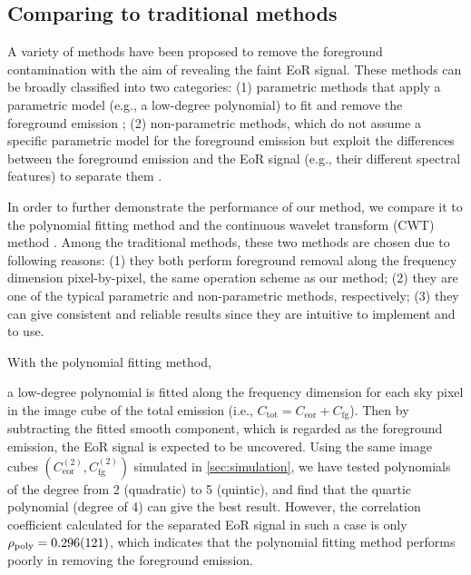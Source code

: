 \documentclass[fleqn,usenatbib]{mnras}
\newcommand{\R}[1]{\mathrm{#1}}
\newcommand{\editwip}[1]{{\leavevmode\color{magenta}#1}}
\begin{document}
\editwip{%
\subsection{Comparing to traditional methods}
\label{sec:comparisons}

A variety of methods have been proposed to remove the foreground
contamination with the aim of revealing the faint EoR signal.
These methods can be broadly classified into two categories:
(1) parametric methods that apply a parametric model (e.g., a low-degree
polynomial) to fit and remove the foreground emission
\citep[e.g.,][]{wang2006,liu2009fgrm,wang2013};
(2) non-parametric methods, which do not assume a specific parametric model
for the foreground emission but exploit the differences between the
foreground emission and the EoR signal (e.g., their different spectral
features) to separate them
\citep[e.g.,][]{harker2009,gu2013,chapman2013,mertens2018}.

In order to further demonstrate the performance of our method, we compare
it to the polynomial fitting method \citep[e.g.,][]{wang2006} and the
continuous wavelet transform (CWT) method \citep{gu2013}.
Among the traditional methods, these two methods are chosen due to
following reasons:
(1) they both perform foreground removal along the frequency dimension
pixel-by-pixel, the same operation scheme as our method;
(2) they are one of the typical parametric and non-parametric methods,
respectively;
(3) they can give consistent and reliable results since they are intuitive
to implement and to use.

With the polynomial fitting method,} %
a low-degree polynomial is fitted along the frequency dimension for each
sky pixel in the image cube of the total emission (i.e.,
$C_{\R{tot}} = C_{\R{eor}} + C_{\R{fg}}$).
Then by subtracting the fitted smooth component, which is regarded as
the foreground emission, the EoR signal is expected to be uncovered.
\editwip{Using the same image cubes
\editwip{$\left( C_{\R{eor}}^{(2)}, C_{\R{fg}}^{(2)} \right)$}
simulated in \autoref{sec:simulation},} %
we have tested polynomials of the degree from 2 (quadratic) to
5 (quintic), and find that the quartic polynomial (degree of 4)
can give the best result.
However, the correlation coefficient calculated for the separated EoR
signal in such a case is only
\editwip{$\rho_{\R{poly}} = \num{0.296 +- 0.121}$},
which indicates that the polynomial fitting method performs poorly in
removing the foreground emission.
\end{document}
